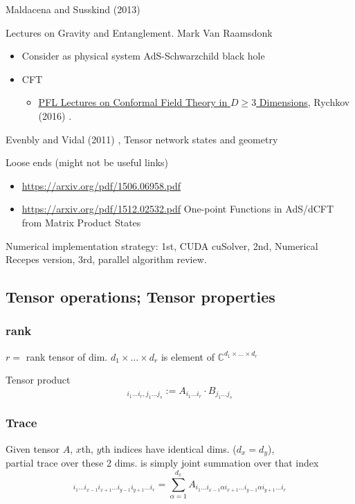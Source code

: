 \documentclass[10pt]{amsart}
\begin{document}
\begin{multicols*}{2}
Maldacena and Susskind (2013) \cite{MaSu2013}  

Lectures on Gravity and Entanglement.  Mark Van Raamsdonk  \cite{Raam2016}

\begin{itemize}
\item Consider as physical system AdS-Schwarzchild black hole   
\item CFT 
\begin{itemize}
\item \href{https://arxiv.org/pdf/1601.05000.pdf}{PFL Lectures on Conformal Field Theory in $D\geq 3$ Dimensions}, Rychkov (2016) \cite{Rych2016}.  
\end{itemize}
\end{itemize}

Evenbly and Vidal (2011) \cite{EvVi2011}, Tensor network states and geometry

Loose ends (might not be useful links)
\begin{itemize}
\item \url{https://arxiv.org/pdf/1506.06958.pdf}
\item \url{https://arxiv.org/pdf/1512.02532.pdf} One-point Functions in AdS/dCFT from Matrix Product States
\end{itemize}

Numerical implementation strategy: 1st, CUDA cuSolver, 2nd, Numerical Recepes version, 3rd, parallel algorithm review.


\subsection{Tensor operations; Tensor properties}

\subsubsection{rank}

$r=$ rank tensor of dim. $d_1\times \dots \times d_r$ is element of $\mathbb{C}^{d_1\times \dots \times d_r}$  

Tensor product
\begin{equation}
	[A \otimes B]_{i_1 \dots i_r, j_1 \dots j_s } := A_{i_1 \dots i_r} \cdot B_{j_1 \dots j_s }
\end{equation}

\subsubsection{Trace}
Given tensor $A$, $x$th, $y$th indices have identical dims. ($d_x = d_y$), \\
partial trace over these 2 dims. is simply joint summation over that index
\begin{equation}
	[\text{Tr}_{x,y} A]_{i_1\dots i_{x-1}i_{x+1} \dots i_{y-1}i_{y+1} \dots i_r} = \sum_{\alpha=1}^{d_x} A_{i_1 \dots i_{x-1} \alpha i_{x+1} \dots i_{y-1} \alpha i_{y+1} \dots i_r}
\end{equation}


\end{multicols*}
\end{document}
